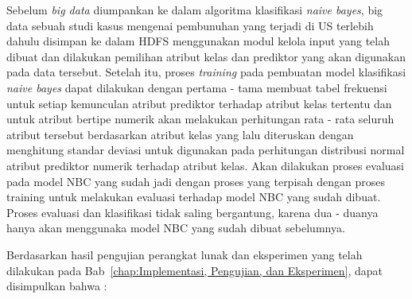 Sebelum \textit{big data} diumpankan ke dalam algoritma klasifikasi \textit{naive bayes}, big data sebuah studi kasus mengenai pembunuhan yang terjadi di US terlebih dahulu disimpan ke dalam HDFS menggunakan modul kelola input yang telah dibuat dan dilakukan pemilihan atribut kelas dan prediktor yang akan digunakan pada data tersebut. Setelah itu, proses \textit{training} pada pembuatan model klasifikasi \textit{naive bayes} dapat dilakukan dengan pertama - tama membuat tabel frekuensi untuk setiap kemunculan atribut prediktor terhadap atribut kelas tertentu dan untuk atribut bertipe numerik akan melakukan perhitungan rata - rata seluruh atribut tersebut berdasarkan atribut kelas yang lalu diteruskan dengan menghitung standar deviasi untuk digunakan pada perhitungan distribusi normal atribut prediktor numerik terhadap atribut kelas. Akan dilakukan proses evaluasi pada model NBC yang sudah jadi dengan proses yang terpisah dengan proses training untuk melakukan evaluasi terhadap model NBC yang sudah dibuat. Proses evaluasi dan klasifikasi tidak saling bergantung, karena dua - duanya hanya akan menggunaka model NBC yang sudah dibuat sebelumnya.

Berdasarkan hasil pengujian perangkat lunak dan eksperimen yang telah dilakukan pada Bab~\ref{chap:Implementasi, Pengujian, dan Eksperimen}, dapat disimpulkan bahwa :

